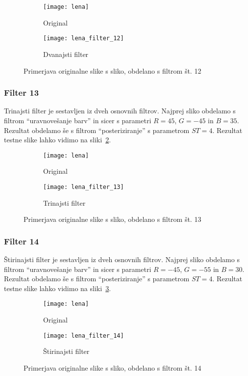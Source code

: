 \begin{figure}[!ht]
    \centering
    \begin{subfigure}[b]{0.4\textwidth}
        \texttt{[image: lena]}
        \caption{Original}
    \end{subfigure}
    \begin{subfigure}[b]{0.4\textwidth}
        \texttt{[image: lena\_filter\_12]}
        \caption{Dvanajsti filter}
    \end{subfigure}
    \caption{Primerjava originalne slike s sliko, obdelano s filtrom št. 12}
    \label{fig:lena_filter_12}
\end{figure}


\subsubsection*{Filter 13}
Trinajsti filter je sestavljen iz dveh osnovnih filtrov. Najprej sliko obdelamo s
filtrom ``uravnovešanje barv'' in sicer s parametri $R = 45$, $G = -45$ in
$B = 35$. Rezultat obdelamo še s filtrom ``posteriziranje'' s parametrom
$ST =4$. Rezultat testne slike lahko vidimo na sliki~\ref{fig:lena_filter_13}.

\begin{figure}[!ht]
    \centering
    \begin{subfigure}[b]{0.4\textwidth}
        \texttt{[image: lena]}
        \caption{Original}
    \end{subfigure}
    \begin{subfigure}[b]{0.4\textwidth}
        \texttt{[image: lena\_filter\_13]}
        \caption{Trinajsti filter}
    \end{subfigure}
    \caption{Primerjava originalne slike s sliko, obdelano s filtrom št. 13}
    \label{fig:lena_filter_13}
\end{figure}


\subsubsection*{Filter 14}
Štirinajsti filter je sestavljen iz dveh osnovnih filtrov. Najprej sliko obdelamo s
filtrom ``uravnovešanje barv'' in sicer s parametri $R = -45$, $G = -55$ in
$B = 30$. Rezultat obdelamo še s filtrom ``posteriziranje'' s parametrom
$ST =4$. Rezultat testne slike lahko vidimo na sliki~\ref{fig:lena_filter_14}.

\begin{figure}[!ht]
    \centering
    \begin{subfigure}[b]{0.4\textwidth}
        \texttt{[image: lena]}
        \caption{Original}
    \end{subfigure}
    \begin{subfigure}[b]{0.4\textwidth}
        \texttt{[image: lena\_filter\_14]}
        \caption{Štirinajsti filter}
    \end{subfigure}
    \caption{Primerjava originalne slike s sliko, obdelano s filtrom št. 14}
    \label{fig:lena_filter_14}
\end{figure}


